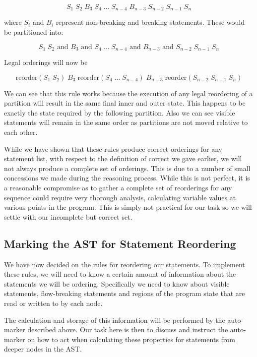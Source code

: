 \documentclass[twoside,a4paper]{report}
\begin{document}
$$S_1 \; S_2 \; B_3 \; S_4 \; \ldots \; S_{n-4} \; B_{n-3} \; S_{n-2} \; S_{n-1} \; S_n$$

where $S_i$ and $B_i$ represent non-breaking and breaking statements. These would be partitioned into:

$$S_1 \; S_2 \text{ and } B_3 \text{ and } S_4 \; \ldots \; S_{n-4} \text{ and } B_{n-3} \text{ and } S_{n-2} \; S_{n-1} \; S_n$$

Legal orderings will now be

$$\text{reorder}(S_1 \; S_2) \; B_3 \; \text{reorder}(S_4 \; \ldots \; S_{n-4}) \; B_{n-3} \; \text{reorder}(S_{n-2} \; S_{n-1} \; S_n)$$

We can see that this rule works because the execution of any legal reordering of a partition will result in the same final inner and outer state.
This happens to be exactly the state required by the following partition. Also we can see visible statements will remain in the same order as
partitions are not moved relative to each other.

While we have shown that these rules produce correct orderings for any statement list, with respect to the definition of correct we gave earlier,
we will not always produce a complete set of orderings. This is due to a number of small concessions we made during the reasoning process. While
this is not perfect, it is a reasonable compromise as to gather a complete set of reorderings for any sequence could require very thorough analysis,
calculating variable values at various points in the program. This is simply not practical for our task so we will settle with our incomplete but
correct set.

\subsection{Marking the AST for Statement Reordering}

We have now decided on the rules for reordering our statements. To implement these rules, we will need to know a certain amount of information about
the statements we will be ordering. Specifically we need to know about visible statements, flow-breaking statements and regions of the program
state that are read or written to by each node.

The calculation and storage of this information will be performed by the auto-marker described above. Our task here is then to discuss and instruct
the auto-marker on how to act when calculating these properties for statements from deeper nodes in the AST.
\end{document}
